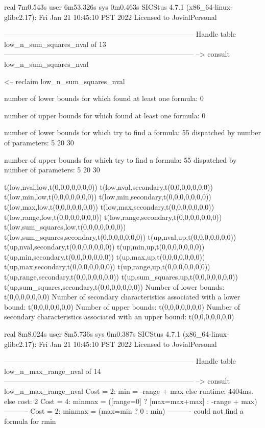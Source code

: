 real	7m0.543s
user	6m53.326s
sys	0m0.463s
SICStus 4.7.1 (x86_64-linux-glibc2.17): Fri Jan 21 10:45:10 PST 2022
Licensed to JovialPersonal


--------------------------------------------------------------------------------
Handle table low_n_sum_squares_nval of 13
--------------------------------------------------------------------------------
--> consult low_n_sum_squares_nval

<-- reclaim low_n_sum_squares_nval

number of lower bounds for which found at least one formula: 0

number of upper bounds for which found at least one formula: 0

number of lower bounds for which try to find a formula: 55
dispatched by number of parameters: 5  20  30

number of upper bounds for which try to find a formula: 55
dispatched by number of parameters: 5  20  30

t(low,nval,low,t(0,0,0,0,0,0,0))
t(low,nval,secondary,t(0,0,0,0,0,0,0))
t(low,min,low,t(0,0,0,0,0,0,0))
t(low,min,secondary,t(0,0,0,0,0,0,0))
t(low,max,low,t(0,0,0,0,0,0,0))
t(low,max,secondary,t(0,0,0,0,0,0,0))
t(low,range,low,t(0,0,0,0,0,0,0))
t(low,range,secondary,t(0,0,0,0,0,0,0))
t(low,sum_squares,low,t(0,0,0,0,0,0,0))
t(low,sum_squares,secondary,t(0,0,0,0,0,0,0))
t(up,nval,up,t(0,0,0,0,0,0,0))
t(up,nval,secondary,t(0,0,0,0,0,0,0))
t(up,min,up,t(0,0,0,0,0,0,0))
t(up,min,secondary,t(0,0,0,0,0,0,0))
t(up,max,up,t(0,0,0,0,0,0,0))
t(up,max,secondary,t(0,0,0,0,0,0,0))
t(up,range,up,t(0,0,0,0,0,0,0))
t(up,range,secondary,t(0,0,0,0,0,0,0))
t(up,sum_squares,up,t(0,0,0,0,0,0,0))
t(up,sum_squares,secondary,t(0,0,0,0,0,0,0))
Number of lower bounds:                                             t(0,0,0,0,0,0,0)
Number of secondary characteristics associated with a lower bound:  t(0,0,0,0,0,0,0)
Number of upper bounds:                                             t(0,0,0,0,0,0,0)
Number of secondary characteristics associated with an upper bound: t(0,0,0,0,0,0,0)

real	8m8.024s
user	8m5.736s
sys	0m0.387s
SICStus 4.7.1 (x86_64-linux-glibc2.17): Fri Jan 21 10:45:10 PST 2022
Licensed to JovialPersonal


--------------------------------------------------------------------------------
Handle table low_n_max_range_nval of 14
--------------------------------------------------------------------------------
--> consult low_n_max_range_nval
Cost =  2:  min    = -range + max
else runtime: 4404ms. else cost: 2
Cost =  4:  minmax = ([range=0] ? [max=max+max] : -range + max) %
----------
Cost =  2:  minmax = (max=min ? 0 : min)
----------
could not find a formula for rmin

